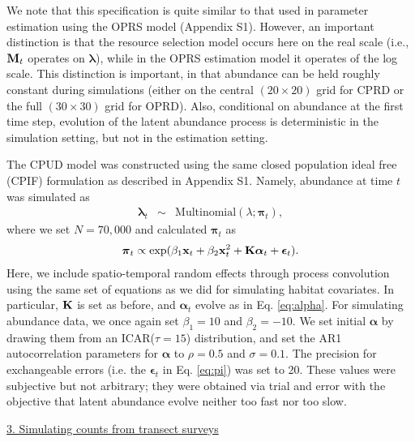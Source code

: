 \documentclass[12pt,fleqn]{article}
\begin{document}
\begin{flushleft}
\begin{enumerate}
\end{enumerate}
We note that this specification is quite similar to that used in parameter estimation using the OPRS model (Appendix S1).  However, an important distinction is that the resource selection model occurs here on the real scale (i.e., ${\bf M}_t$ operates on $\boldsymbol{\lambda}$), while in the OPRS estimation model it operates of the log scale. This distinction is important, in that abundance can be held roughly constant during simulations (either on the central $(20 \times 20)$ grid for CPRD or the full $(30 \times 30)$ grid for OPRD).  Also, conditional on abundance at the first time step, evolution of the latent abundance process is deterministic in the simulation setting, but not in the estimation setting.

\hspace{.5in} The CPUD model was constructed using the same closed population ideal free (CPIF) formulation as described in Appendix S1.  Namely, abundance at time $t$ was simulated as
\begin{eqnarray*}
  \boldsymbol{\lambda}_t & \sim & \text{Multinomial}(\lambda; \boldsymbol{\pi}_t),
\end{eqnarray*}
where we set $N=70,000$ and calculated $\boldsymbol{\pi}_t$ as
\begin{eqnarray}
  \boldsymbol{\pi}_{t} \propto \exp(\beta_1 {\bf x}_t + \beta_2 {\bf x}_t^2 + {\bf K}\boldsymbol{\alpha}_t + \boldsymbol{\epsilon}_t).
  \label{eq:pi}
\end{eqnarray}
Here, we include spatio-temporal random effects through process convolution using the same set of equations as we did for simulating habitat covariates.  In particular, ${\bf K}$ is set as before, and $\boldsymbol{\alpha}_t$ evolve as in Eq. \ref{eq:alpha}.  For simulating abundance data, we once again set $\beta_1 = 10$ and $\beta_2 = -10$.  We set initial $\boldsymbol{\alpha}$ by drawing them from an ICAR($\tau=15$) distribution, and set the AR1 autocorrelation parameters for $\boldsymbol{\alpha}$ to $\rho = 0.5 $ and $\sigma = 0.1$.  The precision for exchangeable errors (i.e. the $\boldsymbol{\epsilon}_t$ in Eq. \ref{eq:pi}) was set to 20.  These values were subjective but not arbitrary; they were obtained via trial and error with the objective that latent abundance evolve neither too fast nor too slow.

\underline{3. Simulating counts from transect surveys}


\end{flushleft}
\end{document}
